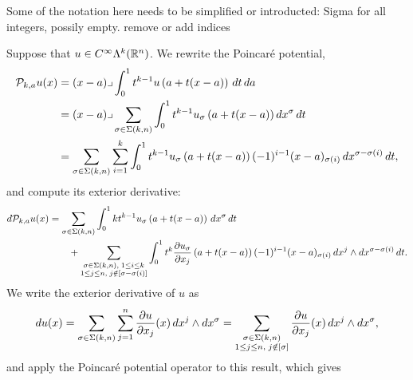 \documentclass[10pt,a4paper]{article}
\newcommand{\mwl}[1]{{\color{red}#1}}
\begin{document}
\mwl{Some of the notation here needs to be simplified or introducted: Sigma for all integers, possily empty. remove or add indices}

Suppose that $u \in C^{\infty}\Lambda^{k}({\mathbb R}^n)$.
We rewrite the Poincar\'e potential,
\begin{align*}
    {\mathcal P}_{k,a} u(x) 
    &= 
    (x-a)\lrcorner \int_{0}^{1} t^{k-1} u\left(a+t(x-a)\right)\,dt\,da\;
    \\&
    = 
    (x-a)\lrcorner 
    \sum_{\sigma \in \Sigma(k,n)}
    \int_{0}^{1} 
    t^{k-1} u_{\sigma}\left(a+t(x-a)\right) dx^{\sigma} \,dt 
    \\&
    = 
    \sum_{\sigma \in \Sigma(k,n)} \sum_{i=1}^{k}
    \int_{0}^{1} 
    t^{k-1} u_{\sigma}\left(a+t(x-a)\right) (-1)^{i-1} (x-a)_{\sigma(i) } \,dx^{\sigma-\sigma(i)} \,dt 
    ,
\end{align*}
and compute its exterior derivative:
\begin{align*}
    d {\mathcal P}_{k,a} u(x) 
    &= 
    \sum_{\sigma \in \Sigma(k,n)} 
    \int_{0}^{1} 
    k t^{k-1} u_{\sigma}\left(a+t(x-a)\right) \,dx^{\sigma} \,dt 
    \\&\qquad
    + 
    \sum_{\substack{ \sigma \in \Sigma(k,n), \; 1 \leq i \leq k \\ 1 \leq j \leq n, \; j \notin [\sigma-\sigma(i)] }}
    \int_{0}^{1} 
    t^{k} \frac{ \partial u_{\sigma} }{\partial x_{j}}\left(a+t(x-a)\right) (-1)^{i-1} (x-a)_{\sigma(i) } \,dx^{j} \wedge dx^{\sigma-\sigma(i)} \,dt 
    .
\end{align*}
We write the exterior derivative of $u$ as 
\begin{align*}
    d u(x)
    =
    \sum_{\sigma \in \Sigma(k,n)} \sum_{j=1}^{n}
    \frac{ \partial u }{\partial x_{j}}(x) \,dx^{j} \wedge dx^{\sigma} 
    =
    \sum_{\substack{ \sigma \in \Sigma(k,n) \\ 1 \leq j \leq n, \; j \notin [\sigma] }}
    \frac{ \partial u }{\partial x_{j}}(x) \,dx^{j} \wedge dx^{\sigma} 
    ,
\end{align*}
and apply the Poincar\'e potential operator to this result, which gives 
\end{document}
